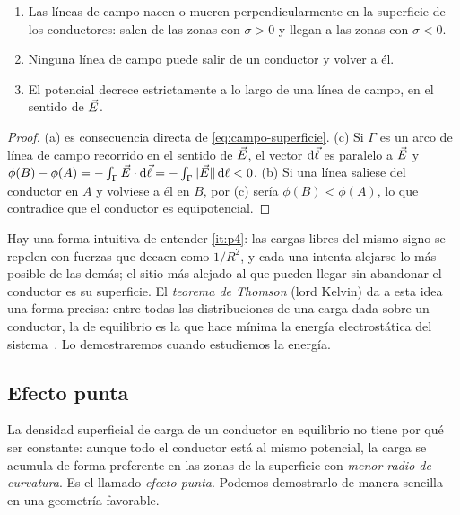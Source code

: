 \begin{corolario}\label{cor:lineas}
\begin{enumerate}[label=\textup{(\alph*)}]
  \item Las líneas de campo nacen o mueren perpendicularmente en la superficie de los conductores: salen de las zonas con $\sigma>0$ y llegan a
        las zonas con $\sigma<0$.
  \item Ninguna línea de campo puede salir de un conductor y volver a él.
  \item El potencial decrece estrictamente a lo largo de una línea de campo, en el sentido de $\vec{E}$.
\end{enumerate}
\end{corolario}
\begin{proof}
(a) es consecuencia directa de \cref{eq:campo-superficie}. (c) Si $\Gamma$ es un arco de línea de campo recorrido en el sentido de $\vec{E}$, el vector
$\mathrm{d}\vec{\ell}$ es paralelo a $\vec{E}$ y $\phi(B)-\phi(A)=-\int_{\Gamma}\vec{E}\cdot\mathrm{d}\vec{\ell}=-\int_{\Gamma}\lVert \vec{E}\rVert\,\mathrm{d}\ell<0$. (b) Si una línea saliese del conductor en
$A$ y volviese a él en $B$, por (c) sería $\phi(B)<\phi(A)$, lo que contradice que el conductor es equipotencial.
\end{proof}

\begin{observacion}\label{obs:thomson}
Hay una forma intuitiva de entender \ref{it:p4}: las cargas libres del mismo signo se repelen con fuerzas que decaen como $1/R^{2}$, y cada
una intenta alejarse lo más posible de las demás; el sitio más alejado al que pueden llegar sin abandonar el conductor es su superficie. El
\emph{teorema de Thomson} (lord Kelvin) da a esta idea una forma precisa: entre todas las distribuciones de una carga dada sobre un conductor,
la de equilibrio es la que hace mínima la energía electrostática del sistema~\cite{JACKSON}. Lo demostraremos cuando estudiemos la energía.
\end{observacion}

\subsection{Efecto punta}\label{sec:punta}
La densidad superficial de carga de un conductor en equilibrio no tiene por qué ser constante: aunque todo el conductor está al mismo
potencial, la carga se acumula de forma preferente en las zonas de la superficie con \emph{menor radio de curvatura}. Es el llamado
\emph{efecto punta}. Podemos demostrarlo de manera sencilla en una geometría favorable.

